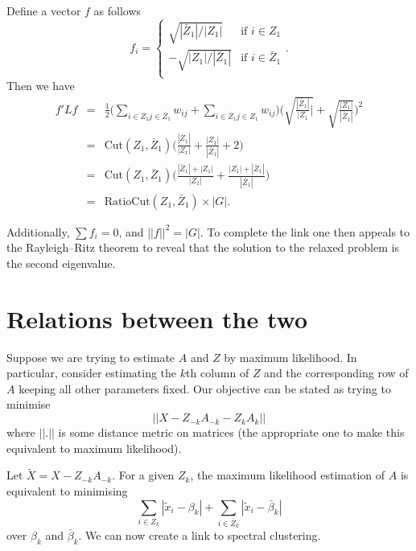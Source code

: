 \documentclass{article}
\numberwithin{equation}{section}
\numberwithin{thm}{section}
\def\IBP{Z}
\def\Weights{A}
\def\Data{X}
\def\Graph{G}
\def\Laplacian{L}
\begin{document}
Define a vector $f$ as follows
\begin{equation}
f_i =
\begin{cases}
\sqrt{|\bar\IBP_1|/|\IBP_1|} & \textrm{if } i \in \IBP_1\\
-\sqrt{|\IBP_1|/|\bar\IBP_1|} & \textrm{if } i \in \bar\IBP_1\\
\end{cases}.
\end{equation}
Then we have
\begin{eqnarray}
f' \Laplacian f & = & \frac{1}{2}\Bigg(\sum_{i\in \IBP_1 j \in \bar\IBP_1} w_{ij} + \sum_{i\in \bar\IBP_1 j \in \IBP_1} w_{ij}\Bigg) \Bigg(\sqrt{\frac{|\bar\IBP_1|}{|\IBP_1}|} + \sqrt{\frac{|\IBP_1|}{|\bar\IBP_1|}}\Bigg)^2 \\
& = & \textrm{Cut}(\IBP_1, \bar\IBP_1)\Bigg(\frac{|\bar\IBP_1|}{|\IBP_1|} + \frac{|\IBP_1|}{|\bar\IBP_1|} + 2\Bigg) \\
& = & \textrm{Cut}(\IBP_1, \bar\IBP_1)\Bigg(\frac{|\bar\IBP_1| + |\IBP_1|}{|\IBP_1|} + \frac{|\IBP_1| + |\bar\IBP_1|}{|\bar\IBP_1|}\Bigg) \\
& = & \textrm{RatioCut}(\IBP_1, \bar\IBP_1) \times |\Graph|.
\end{eqnarray}

Additionally, $\sum f_i = 0$, and $||f||^2 = |\Graph|$.
To complete the link one then appeals to the Rayleigh--Ritz theorem to reveal that the solution to the relaxed problem is the second eigenvalue.

\section{Relations between the two}

Suppose we are trying to estimate $\Weights$ and $\IBP$ by maximum likelihood.
In particular, consider estimating the $k$th column of $\IBP$ and the corresponding row of $\Weights$ keeping all other parameters fixed.
Our objective can be stated as trying to minimise
\begin{equation}
||\Data - \IBP_{-k}\Weights_{-k} - \IBP_{k}\Weights_{k}||
\end{equation}
where $||.||$ is some distance metric on matrices (\ie the appropriate one to make this equivalent to maximum likelihood).

Let $\tilde X = \Data - \IBP_{-k}\Weights_{-k}$.
For a given $\IBP_k$, the maximum likelihood estimation of $\Weights$ is equivalent to minimising
\begin{equation}
\sum_{i \in \IBP_k}|\tilde x_i - \beta_k| + \sum_{i \in \bar\IBP_k}|\tilde x_i - \bar\beta_k|
\end{equation}
over $\beta_k$ and $\bar\beta_k$.
We can now create a link to spectral clustering.
\end{document}
